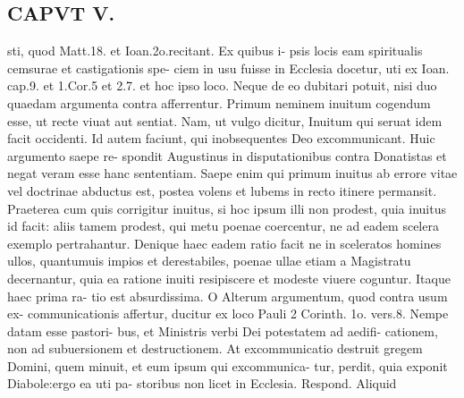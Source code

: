 \documentclass{article}
\begin{document}
\begin{pages}
\section*{CAPVT  V. }
\marginpar{[ p.389 ]}sti, quod Matt.18. et Ioan.2o.recitant. Ex quibus i- psis locis eam spiritualis cemsurae et castigationis spe- ciem in usu fuisse in Ecclesia docetur, uti ex Ioan. cap.9. et 1.Cor.5 et 2.7. et hoc ipso loco. Neque de eo dubitari potuit, nisi duo quaedam argumenta contra afferrentur. Primum neminem inuitum cogendum esse, ut recte viuat aut sentiat. Nam, ut vulgo dicitur, Inuitum qui seruat idem facit occidenti. Id autem faciunt, qui inobsequentes Deo excommunicant. Huic argumento saepe re- spondit Augustinus in disputationibus contra Donatistas et negat veram esse hanc sententiam. Saepe enim qui primum inuitus ab errore vitae vel doctrinae abductus est, postea volens et lubems in recto itinere permansit. Praeterea cum quis corrigitur inuitus, si hoc ipsum illi non prodest, quia inuitus id facit: aliis tamem prodest, qui metu poenae coercentur, ne ad eadem scelera exemplo pertrahantur. Denique haec eadem ratio facit ne in sceleratos homines ullos, quantumuis impios et derestabiles, poenae ullae etiam a Magistratu decernantur, quia ea ratione inuiti resipiscere et modeste viuere coguntur. Itaque haec prima ra- tio est absurdissima. O Alterum argumentum, quod contra usum ex- communicationis affertur, ducitur ex loco Pauli 2 Corinth. 1o. vers.8. Nempe datam esse pastori- bus, et Ministris verbi Dei potestatem ad aedifi- cationem, non ad subuersionem et destructionem. At excommunicatio destruit gregem Domini, quem minuit, et eum ipsum qui excommunica- tur, perdit, quia exponit Diabole:ergo ea uti pa- storibus non licet in Ecclesia. Respond. Aliquid 

\end{pages}
\end{document}
